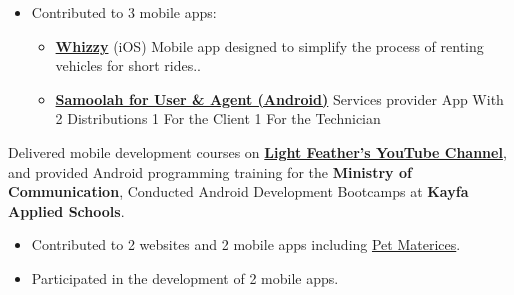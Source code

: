 \documentclass[10pt,a4paper,ragged2e,withhyper]{altacv}
\begin{document}
\begin{itemize}
\item Contributed to 3 mobile apps:
\begin{itemize}
\item \hyperlink{whizzy}{\textbf{Whizzy}} (iOS) Mobile app designed to simplify the process of renting vehicles for short rides..
\item \hyperlink{samoolah}{\textbf{Samoolah for User \& Agent (Android)}} Services provider App With 2 Distributions 1 For the Client 1 For the Technician
\end{itemize}
\end{itemize}
\divider


Delivered mobile development courses on \textcolor{TertiaryColor}{\textbf{\href{https://www.youtube.com/c/LightFeather42}{Light Feather's YouTube Channel}}}, and provided Android programming training for the \textbf{\textcolor{TertiaryColor}{Ministry of Communication}},
Conducted Android Development Bootcamps at \textcolor{TertiaryColor}{\textbf{Kayfa Applied Schools}}.\linebreak
\divider


\begin{itemize}
\item Contributed to 2 websites and 2 mobile apps including  \hyperlink{pet_materices}{Pet Materices}.
\end{itemize}
\divider

\begin{itemize}
\item Participated in the development of 2 mobile apps.
\end{itemize}





\end{document}
